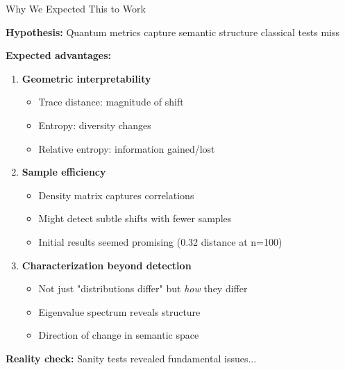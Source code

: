 \documentclass[aspectratio=169,11pt]{beamer}
\begin{document}
\begin{frame}{Why We Expected This to Work}

\textbf{Hypothesis:} Quantum metrics capture semantic structure classical tests miss

\vspace{0.5em}

\textbf{Expected advantages:}

\begin{enumerate}
  \item \textbf{Geometric interpretability}
  \begin{itemize}
    \item Trace distance: magnitude of shift
    \item Entropy: diversity changes
    \item Relative entropy: information gained/lost
  \end{itemize}

  \vspace{0.3em}

  \item \textbf{Sample efficiency}
  \begin{itemize}
    \item Density matrix captures correlations
    \item Might detect subtle shifts with fewer samples
    \item Initial results seemed promising (0.32 distance at n=100)
  \end{itemize}

  \vspace{0.3em}

  \item \textbf{Characterization beyond detection}
  \begin{itemize}
    \item Not just "distributions differ" but \emph{how} they differ
    \item Eigenvalue spectrum reveals structure
    \item Direction of change in semantic space
  \end{itemize}
\end{enumerate}

\vspace{0.5em}

\textbf{Reality check:} Sanity tests revealed fundamental issues...

\end{frame}
\end{document}

